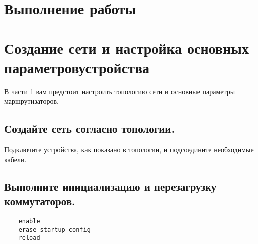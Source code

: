 \section*{\LARGE Выполнение работы}


\section{Создание сети и настройка основных параметровустройства}
В части 1 вам предстоит настроить топологию сети и основные параметры маршрутизаторов.

\subsection{Создайте сеть согласно топологии.}
Подключите устройства, как показано в топологии, и подсоедините необходимые кабели.

\subsection{Выполните инициализацию и перезагрузку коммутаторов.}
\begin{verbatim}
    enable
    erase startup-config
    reload
\end{verbatim}

